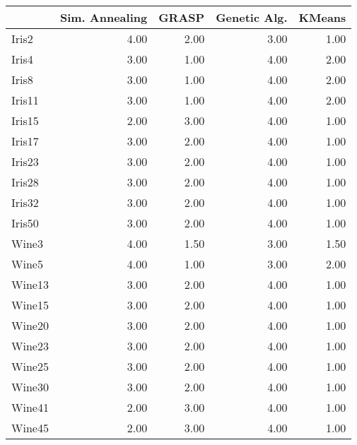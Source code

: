 \begin{table}
\centering
\label{tab:test_ranks}
\begin{tabular}{lrrrr}
\toprule
{} &  Sim. Annealing &  GRASP &  Genetic Alg. &  KMeans \\
\midrule
Iris2      &                 4.00 &   2.00 &               3.00 &    1.00 \\
Iris4      &                 3.00 &   1.00 &               4.00 &    2.00 \\
Iris8      &                 3.00 &   1.00 &               4.00 &    2.00 \\
Iris11     &                 3.00 &   1.00 &               4.00 &    2.00 \\
Iris15     &                 2.00 &   3.00 &               4.00 &    1.00 \\
Iris17     &                 3.00 &   2.00 &               4.00 &    1.00 \\
Iris23     &                 3.00 &   2.00 &               4.00 &    1.00 \\
Iris28     &                 3.00 &   2.00 &               4.00 &    1.00 \\
Iris32     &                 3.00 &   2.00 &               4.00 &    1.00 \\
Iris50     &                 3.00 &   2.00 &               4.00 &    1.00 \\
Wine3      &                 4.00 &   1.50 &               3.00 &    1.50 \\
Wine5      &                 4.00 &   1.00 &               3.00 &    2.00 \\
Wine13     &                 3.00 &   2.00 &               4.00 &    1.00 \\
Wine15     &                 3.00 &   2.00 &               4.00 &    1.00 \\
Wine20     &                 3.00 &   2.00 &               4.00 &    1.00 \\
Wine23     &                 3.00 &   2.00 &               4.00 &    1.00 \\
Wine25     &                 3.00 &   2.00 &               4.00 &    1.00 \\
Wine30     &                 3.00 &   2.00 &               4.00 &    1.00 \\
Wine41     &                 2.00 &   3.00 &               4.00 &    1.00 \\
Wine45     &                 2.00 &   3.00 &               4.00 &    1.00 \\

\end{tabular}
\end{table}
